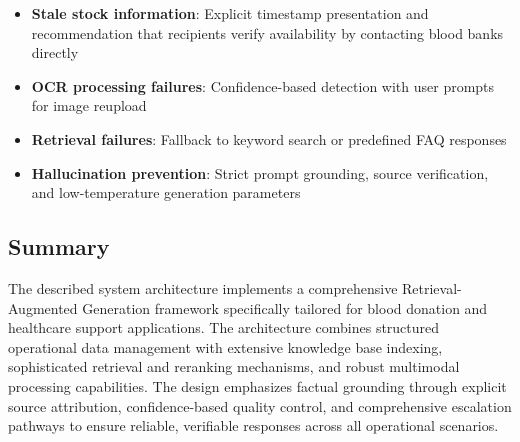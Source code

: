 \begin{itemize}\setlength{\itemsep}{0pt}
    \item \textbf{Stale stock information}: Explicit timestamp presentation and recommendation that recipients verify availability by contacting blood banks directly
    \item \textbf{OCR processing failures}: Confidence-based detection with user prompts for image reupload
    \item \textbf{Retrieval failures}: Fallback to keyword search or predefined FAQ responses
    \item \textbf{Hallucination prevention}: Strict prompt grounding, source verification, and low-temperature generation parameters
\end{itemize}

\subsection{Summary}

The described system architecture implements a comprehensive Retrieval-Augmented Generation framework specifically tailored for blood donation and healthcare support applications. The architecture combines structured operational data management with extensive knowledge base indexing, sophisticated retrieval and reranking mechanisms, and robust multimodal processing capabilities. The design emphasizes factual grounding through explicit source attribution, confidence-based quality control, and comprehensive escalation pathways to ensure reliable, verifiable responses across all operational scenarios.
